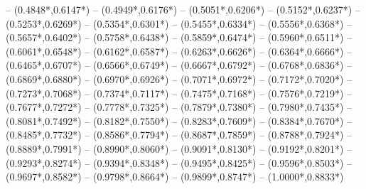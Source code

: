 {	-- ({0.4848*\dx},{0.6147*\dy}) %
	-- ({0.4949*\dx},{0.6176*\dy}) %
	-- ({0.5051*\dx},{0.6206*\dy}) %
	-- ({0.5152*\dx},{0.6237*\dy}) %
	-- ({0.5253*\dx},{0.6269*\dy}) %
	-- ({0.5354*\dx},{0.6301*\dy}) %
	-- ({0.5455*\dx},{0.6334*\dy}) %
	-- ({0.5556*\dx},{0.6368*\dy}) %
	-- ({0.5657*\dx},{0.6402*\dy}) %
	-- ({0.5758*\dx},{0.6438*\dy}) %
	-- ({0.5859*\dx},{0.6474*\dy}) %
	-- ({0.5960*\dx},{0.6511*\dy}) %
	-- ({0.6061*\dx},{0.6548*\dy}) %
	-- ({0.6162*\dx},{0.6587*\dy}) %
	-- ({0.6263*\dx},{0.6626*\dy}) %
	-- ({0.6364*\dx},{0.6666*\dy}) %
	-- ({0.6465*\dx},{0.6707*\dy}) %
	-- ({0.6566*\dx},{0.6749*\dy}) %
	-- ({0.6667*\dx},{0.6792*\dy}) %
	-- ({0.6768*\dx},{0.6836*\dy}) %
	-- ({0.6869*\dx},{0.6880*\dy}) %
	-- ({0.6970*\dx},{0.6926*\dy}) %
	-- ({0.7071*\dx},{0.6972*\dy}) %
	-- ({0.7172*\dx},{0.7020*\dy}) %
	-- ({0.7273*\dx},{0.7068*\dy}) %
	-- ({0.7374*\dx},{0.7117*\dy}) %
	-- ({0.7475*\dx},{0.7168*\dy}) %
	-- ({0.7576*\dx},{0.7219*\dy}) %
	-- ({0.7677*\dx},{0.7272*\dy}) %
	-- ({0.7778*\dx},{0.7325*\dy}) %
	-- ({0.7879*\dx},{0.7380*\dy}) %
	-- ({0.7980*\dx},{0.7435*\dy}) %
	-- ({0.8081*\dx},{0.7492*\dy}) %
	-- ({0.8182*\dx},{0.7550*\dy}) %
	-- ({0.8283*\dx},{0.7609*\dy}) %
	-- ({0.8384*\dx},{0.7670*\dy}) %
	-- ({0.8485*\dx},{0.7732*\dy}) %
	-- ({0.8586*\dx},{0.7794*\dy}) %
	-- ({0.8687*\dx},{0.7859*\dy}) %
	-- ({0.8788*\dx},{0.7924*\dy}) %
	-- ({0.8889*\dx},{0.7991*\dy}) %
	-- ({0.8990*\dx},{0.8060*\dy}) %
	-- ({0.9091*\dx},{0.8130*\dy}) %
	-- ({0.9192*\dx},{0.8201*\dy}) %
	-- ({0.9293*\dx},{0.8274*\dy}) %
	-- ({0.9394*\dx},{0.8348*\dy}) %
	-- ({0.9495*\dx},{0.8425*\dy}) %
	-- ({0.9596*\dx},{0.8503*\dy}) %
	-- ({0.9697*\dx},{0.8582*\dy}) %
	-- ({0.9798*\dx},{0.8664*\dy}) %
	-- ({0.9899*\dx},{0.8747*\dy}) %
	-- ({1.0000*\dx},{0.8833*\dy}) %
}
